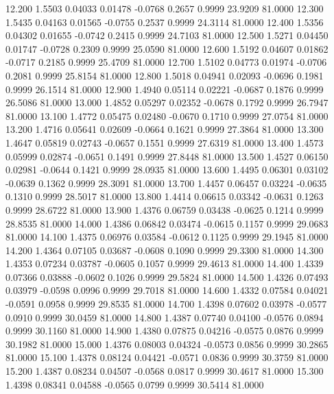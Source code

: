   12.200   1.5503   0.04033   0.01478  -0.0768   0.2657   0.9999  23.9209  81.0000
  12.300   1.5435   0.04163   0.01565  -0.0755   0.2537   0.9999  24.3114  81.0000
  12.400   1.5356   0.04302   0.01655  -0.0742   0.2415   0.9999  24.7103  81.0000
  12.500   1.5271   0.04450   0.01747  -0.0728   0.2309   0.9999  25.0590  81.0000
  12.600   1.5192   0.04607   0.01862  -0.0717   0.2185   0.9999  25.4709  81.0000
  12.700   1.5102   0.04773   0.01974  -0.0706   0.2081   0.9999  25.8154  81.0000
  12.800   1.5018   0.04941   0.02093  -0.0696   0.1981   0.9999  26.1514  81.0000
  12.900   1.4940   0.05114   0.02221  -0.0687   0.1876   0.9999  26.5086  81.0000
  13.000   1.4852   0.05297   0.02352  -0.0678   0.1792   0.9999  26.7947  81.0000
  13.100   1.4772   0.05475   0.02480  -0.0670   0.1710   0.9999  27.0754  81.0000
  13.200   1.4716   0.05641   0.02609  -0.0664   0.1621   0.9999  27.3864  81.0000
  13.300   1.4647   0.05819   0.02743  -0.0657   0.1551   0.9999  27.6319  81.0000
  13.400   1.4573   0.05999   0.02874  -0.0651   0.1491   0.9999  27.8448  81.0000
  13.500   1.4527   0.06150   0.02981  -0.0644   0.1421   0.9999  28.0935  81.0000
  13.600   1.4495   0.06301   0.03102  -0.0639   0.1362   0.9999  28.3091  81.0000
  13.700   1.4457   0.06457   0.03224  -0.0635   0.1310   0.9999  28.5017  81.0000
  13.800   1.4414   0.06615   0.03342  -0.0631   0.1263   0.9999  28.6722  81.0000
  13.900   1.4376   0.06759   0.03438  -0.0625   0.1214   0.9999  28.8535  81.0000
  14.000   1.4386   0.06842   0.03474  -0.0615   0.1157   0.9999  29.0683  81.0000
  14.100   1.4375   0.06976   0.03584  -0.0612   0.1125   0.9999  29.1945  81.0000
  14.200   1.4364   0.07105   0.03687  -0.0608   0.1090   0.9999  29.3300  81.0000
  14.300   1.4353   0.07234   0.03787  -0.0605   0.1057   0.9999  29.4613  81.0000
  14.400   1.4339   0.07366   0.03888  -0.0602   0.1026   0.9999  29.5824  81.0000
  14.500   1.4326   0.07493   0.03979  -0.0598   0.0996   0.9999  29.7018  81.0000
  14.600   1.4332   0.07584   0.04021  -0.0591   0.0958   0.9999  29.8535  81.0000
  14.700   1.4398   0.07602   0.03978  -0.0577   0.0910   0.9999  30.0459  81.0000
  14.800   1.4387   0.07740   0.04100  -0.0576   0.0894   0.9999  30.1160  81.0000
  14.900   1.4380   0.07875   0.04216  -0.0575   0.0876   0.9999  30.1982  81.0000
  15.000   1.4376   0.08003   0.04324  -0.0573   0.0856   0.9999  30.2865  81.0000
  15.100   1.4378   0.08124   0.04421  -0.0571   0.0836   0.9999  30.3759  81.0000
  15.200   1.4387   0.08234   0.04507  -0.0568   0.0817   0.9999  30.4617  81.0000
  15.300   1.4398   0.08341   0.04588  -0.0565   0.0799   0.9999  30.5414  81.0000
